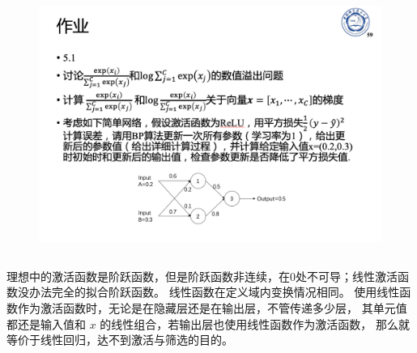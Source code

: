 \documentclass[UTF8,a4paper,AutoFakeBold,AutoFakeSlant]{article}
\begin{document}
\begin{figure}[H]
  \centering
  \includegraphics[scale=0.35]{hw5.png}
  \label{f6}
\end{figure}


\subsection{}

理想中的激活函数是阶跃函数，但是阶跃函数非连续，在0处不可导；线性激活函数没办法完全的拟合阶跃函数。
线性函数在定义域内变换情况相同。
使用线性函数作为激活函数时，无论是在隐藏层还是在输出层，不管传递多少层，
其单元值都还是输入值和 $x$ 的线性组合，若输出层也使用线性函数作为激活函数，
那么就等价于线性回归，达不到激活与筛选的目的。



\subsection{}
\end{document}
